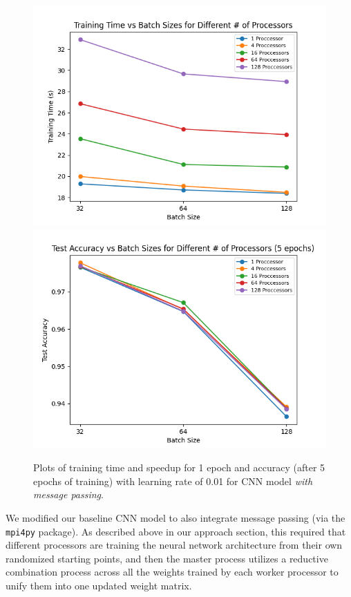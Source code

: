 \documentclass{article}
\begin{document}
\begin{figure}[!h]
    \centering
    \includegraphics[scale=0.5]{cnn_mpi_bs_time}
    \includegraphics[scale=0.5]{cnn_mpi_bs_acc}
    \caption{Plots of training time and speedup for 1 epoch and accuracy (after 5 epochs of training) with learning rate of 0.01 for CNN model \textit{with message passing}.}
    \label{fig:cnn_bs}
\end{figure}

We modified our baseline CNN model to also integrate message passing (via the \texttt{mpi4py} package). As described above in our approach section, this required that different processors are training the neural network architecture from their own randomized starting points, and then the master process utilizes a reductive combination process across all the weights trained by each worker processor to unify them into one updated weight matrix.
\end{document}
